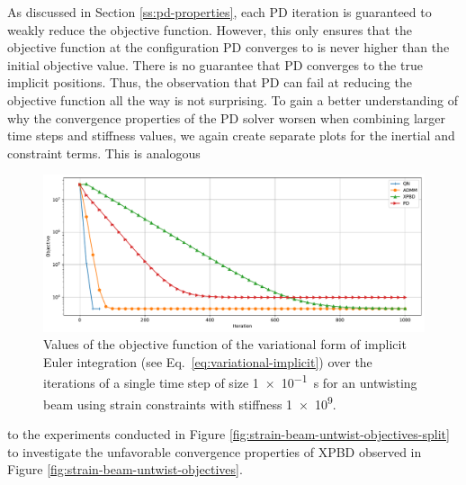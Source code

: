 As discussed in Section \ref{ss:pd-properties}, each PD iteration is guaranteed to weakly reduce the objective function. However, this only ensures that the objective function 
at the configuration PD converges to is never higher than the initial objective value. There is no guarantee that 
PD converges to the true implicit positions. Thus, the observation that PD can fail at reducing the objective function all the way is not surprising. To gain a better 
understanding of why the convergence properties of the PD solver worsen when combining larger time steps and stiffness values, we again create separate plots for the 
inertial and constraint terms. This is analogous 

\begin{figure}[h]
    \includegraphics[width=\textwidth]{figures/strain_beam_untwist_objectives_large_ts.pdf}
    \caption{Values of the objective function of the variational form of implicit Euler integration (see Eq.\ \ref{eq:variational-implicit}) over the iterations of a single time 
        step of size \SI{1e-1}{\second} for an untwisting beam using strain constraints with stiffness \num{1e9}.}
    \label{fig:strain-beam-untwist-objectives-large-ts}
\end{figure}

\noindent
to the experiments conducted in Figure \ref{fig:strain-beam-untwist-objectives-split} to investigate 
the unfavorable convergence properties of XPBD observed in Figure \ref{fig:strain-beam-untwist-objectives}. 

